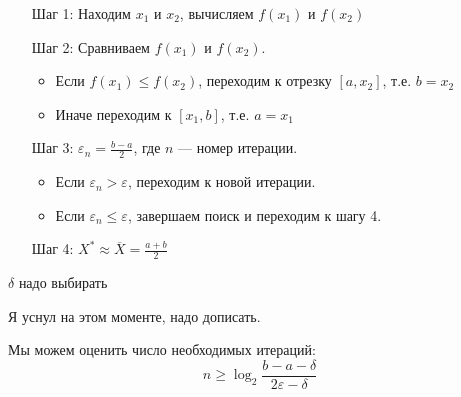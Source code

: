 \documentclass[12pt, a4paper, oneside]{book}
\begin{document}
\begin{itemize}
    \item [Шаг 1:] Находим \(x_1\) и \(x_2\), вычисляем \(f(x_1)\) и \(f(x_2)\)
    \item [Шаг 2:] Сравниваем \(f(x_1)\) и \(f(x_2)\).
          \begin{itemize}
              \item Если \(f(x_1) \leq f(x_2)\), переходим к отрезку \([a, x_2]\), т.е. \(b = x_2\)
              \item Иначе переходим к \([x_1, b]\), т.е. \(a = x_1\)
          \end{itemize}
    \item [Шаг 3:] \(\varepsilon_n = \frac{b - a}{2} \), где \(n\) --- номер итерации.
          \begin{itemize}
              \item Если \(\varepsilon_n > \varepsilon\), переходим к новой итерации.
              \item Если \(\varepsilon_n \leq \varepsilon\), завершаем поиск и переходим к шагу 4.
          \end{itemize}
    \item [Шаг 4:] \(X^* \approx \overline X = \frac{a + b}{2}\)
\end{itemize}

\(\delta\) надо выбирать \?

\begin{remark}
    Я уснул на этом моменте, надо дописать. %
\end{remark}

Мы можем оценить число необходимых итераций:
\[n \geq \log_2 \frac{b - a - \delta}{2\varepsilon - \delta}\]
\end{document}
